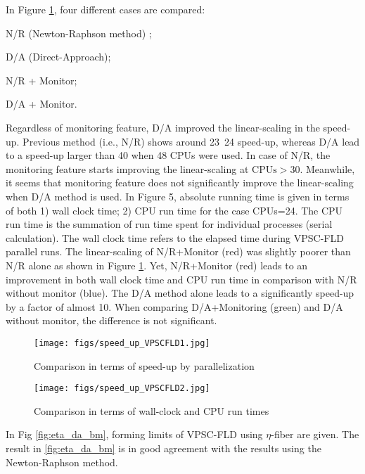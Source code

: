 \documentclass[12pt]{amsart}
\begin{document}
In Figure \ref{fig:speed_up_da1}, four different cases are compared:
\begin{inparaenum}[i\upshape)]
\item N/R  (Newton-Raphson method) ;
\item D/A  (Direct-Approach);
\item N/R + Monitor;
\item D/A + Monitor.
\end{inparaenum}
Regardless of monitoring feature, D/A improved the linear-scaling in the speed-up.
Previous method (i.e., N/R) shows around 23~24 speed-up, whereas D/A lead to a speed-up larger than 40 when 48 CPUs were used.
In case of N/R, the monitoring feature starts improving the linear-scaling at $\text{CPUs} > 30$.
Meanwhile, it seems that monitoring feature does not significantly improve the linear-scaling when D/A method is used.
In Figure 5, absolute running time is given in terms of both 1) wall clock time; 2) CPU run time for the case CPUs=24.
The CPU run time is the summation of run time spent for individual processes (serial calculation).
The wall clock time refers to the elapsed time during VPSC-FLD parallel runs.
The linear-scaling of N/R+Monitor (red) was slightly poorer than N/R alone as shown in Figure \ref{fig:speed_up_da1}.
Yet, N/R+Monitor (red) leads to an improvement in both wall clock time and CPU run time in comparison with N/R without monitor (blue).
The D/A method alone leads to a significantly speed-up by a factor of almost 10.
When comparing D/A+Monitoring (green) and D/A without monitor, the difference is not significant.


\begin{figure}%
  \texttt{[image: figs/speed\_up\_VPSCFLD1.jpg]}
  \caption{Comparison in terms of speed-up by parallelization}
  \label{fig:speed_up_da1}
\end{figure}

\begin{figure}%
  \texttt{[image: figs/speed\_up\_VPSCFLD2.jpg]}
  \caption{Comparison in terms of wall-clock and CPU run times}
  \label{fig:speed_up_da2}
\end{figure}


In Fig \ref{fig:eta_da_bm}, forming limits of VPSC-FLD using $\eta$-fiber are given.
The result in \ref{fig:eta_da_bm} is in good agreement with the results using the Newton-Raphson method.
\end{document}
